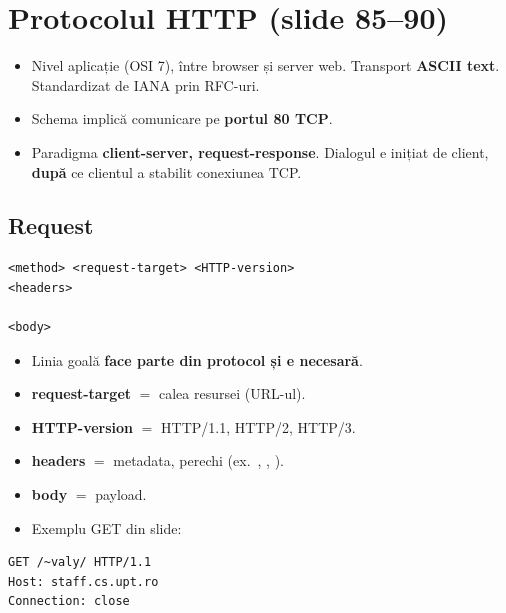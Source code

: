 \documentclass[11pt,a4paper]{article}
\begin{document}

\section{Protocolul HTTP (slide 85--90)}
\begin{itemize}
  \item Nivel aplicație (OSI 7), între browser și server web. Transport \textbf{ASCII text}. Standardizat de IANA prin RFC-uri.
  \item Schema  implică comunicare pe \textbf{portul 80 TCP}.
  \item Paradigma \textbf{client-server, request-response}. Dialogul e inițiat de client, \textbf{după} ce clientul a stabilit conexiunea TCP.
\end{itemize}

\subsection*{Request}
\begin{lstlisting}
<method> <request-target> <HTTP-version>
<headers>

<body>
\end{lstlisting}
\begin{itemize}
  \item Linia goală \textbf{face parte din protocol și e necesară}.
  \item \textbf{request-target} $=$ calea resursei (URL-ul).
  \item \textbf{HTTP-version} $=$ HTTP/1.1, HTTP/2, HTTP/3.
  \item \textbf{headers} $=$ metadata, perechi  (ex.\ , , ).
  \item \textbf{body} $=$ payload.
  \item Exemplu GET din slide:
\end{itemize}
\begin{lstlisting}
GET /~valy/ HTTP/1.1
Host: staff.cs.upt.ro
Connection: close
\end{lstlisting}
\end{document}

